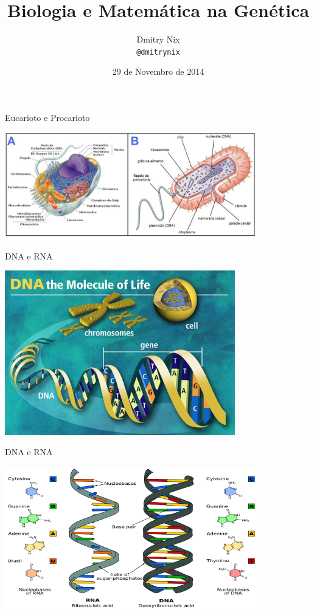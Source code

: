 \documentclass[]{beamer}
\author[Dmitry]{Dmitry Nix \\ \texttt{@dmitrynix}}
\title{Biologia e Matemática na Genética}
\institute{UFPI}
\date{29 de Novembro de 2014}
\begin{document}
  \begin{frame}
    \titlepage
  \end{frame}


  \begin{frame}{Eucarioto e Procarioto}
    \begin{center}
      \includegraphics[width=11cm]{images/eucarioto-procarioto.png}
    \end{center}
  \end{frame}

  \begin{frame}{DNA e RNA}
    \begin{center}
      \includegraphics[width=10cm]{images/dna-e-rna-1.png}
    \end{center}
  \end{frame}

  \begin{frame}{DNA e RNA}
    \begin{center}
      \includegraphics[width=11cm]{images/dna-e-rna.png}
    \end{center}
  \end{frame}
\end{document}
